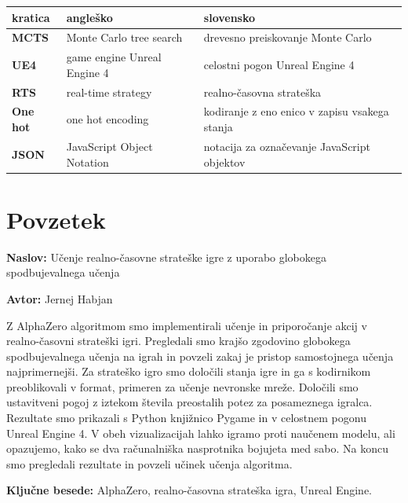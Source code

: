 \documentclass[a4paper, 12pt]{book}
\newcommand{\ttitle}{Učenje realno-časovne strateške igre z uporabo globokega spodbujevalnega učenja}
\newcommand{\tauthor}{Jernej Habjan}
\newcommand{\tkeywords}{AlphaZero, realno-časovna strateška igra, Unreal Engine}
\newcommand{\clearemptydoublepage}{\newpage{\pagestyle{empty}\cleardoublepage}}
\begin{document}
\noindent\begin{tabular}{p{}|p{}|p{}}    %
	{\bf kratica} & {\bf angleško} & {\bf slovensko} \\ \hline
	{\bf MCTS} & Monte Carlo tree search & drevesno preiskovanje Monte Carlo \\
	{\bf UE4} & game engine Unreal Engine 4 & celostni pogon Unreal Engine 4 \\
	{\bf RTS} & real-time strategy & realno-časovna strateška\\
	{\bf One hot} & one hot encoding & kodiranje z eno enico v zapisu vsakega stanja  \\
	{\bf JSON} & JavaScript Object Notation & notacija za označevanje JavaScript objektov \\
\end{tabular}


\clearemptydoublepage

\chapter*{Povzetek}

\noindent\textbf{Naslov:} \ttitle
\bigskip

\noindent\textbf{Avtor:} \tauthor
\bigskip

\noindent 
Z AlphaZero algoritmom smo implementirali učenje in priporočanje akcij v realno-časovni strateški igri.
Pregledali smo krajšo zgodovino globokega spodbujevalnega učenja na igrah in povzeli zakaj je pristop samostojnega učenja najprimernejši.
Za strateško igro smo določili stanja igre in ga s kodirnikom preoblikovali v format, primeren za učenje nevronske mreže.
Določili smo ustavitveni pogoj z iztekom števila preostalih potez za posameznega igralca.
Rezultate smo prikazali s Python knjižnico Pygame in v celostnem pogonu Unreal Engine 4. 
V obeh vizualizacijah lahko igramo proti naučenem modelu, ali opazujemo, kako se dva računalniška nasprotnika bojujeta med sabo.
Na koncu smo pregledali rezultate in povzeli učinek učenja algoritma.
\bigskip

\noindent\textbf{Ključne besede:} \tkeywords.
\clearemptydoublepage

\end{document}
